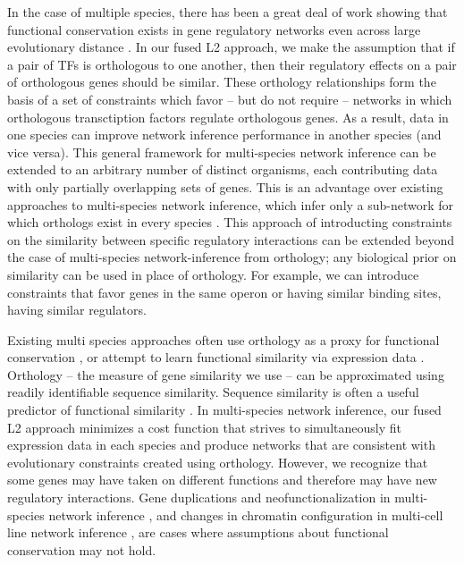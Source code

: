 \documentclass[11pt]{article}
\begin{document}
In the case of multiple species, there has been a great deal of work showing that functional conservation exists in gene regulatory networks even across large evolutionary distance \cite{satou2006gene, hinman2009evolution,tanay2005conservation,erwin2009evolution}. In our fused L2 approach, we make the assumption that if a pair of TFs is orthologous to one another, then their regulatory effects on a pair of orthologous genes should be similar. These orthology relationships form the basis of a set of constraints which favor -- but do not require -- networks in which orthologous transctiption factors regulate orthologous genes. As a result, data in one species can improve network inference performance in another species  (and vice versa). This general framework for multi-species network inference can be extended to an arbitrary number of distinct organisms, each contributing data with only partially overlapping sets of genes. This is an advantage over existing approaches to multi-species network inference, which infer only a sub-network for which orthologs exist in every species \cite{joshi_multi-species_2015}. This approach of introducting constraints on the similarity between specific regulatory interactions can be extended beyond the case of multi-species network-inference from orthology; any biological prior on similarity can be used in place of orthology. For example, we can introduce constraints that favor genes in the same operon or having similar binding sites, having similar regulators.

Existing multi species approaches often use orthology as a proxy for functional conservation \cite{penfold_inferring_2015, joshi_multi-species_2015, kashima_simultaneous_2009, zhang2010nearly}, or attempt to learn functional similarity via expression data \cite{gholami_cross-species_2010}. Orthology -- the measure of gene similarity we use -- can be approximated using readily identifiable sequence similarity. Sequence similarity is often a useful predictor of functional similarity \cite{wilson_assessing_2000}. In multi-species network inference, our fused L2 approach minimizes a cost function that strives to simultaneously fit expression data in each species and produce networks that are consistent with evolutionary constraints created using orthology. However, we recognize that some genes may have taken on different functions and therefore may have new regulatory interactions. Gene duplications and neofunctionalization in multi-species network inference \cite{eisen_phylogenomics:_1998}, and changes in chromatin configuration in multi-cell line network inference \cite{li_role_2007}, are cases where assumptions about functional conservation may not hold. 
\end{document}
